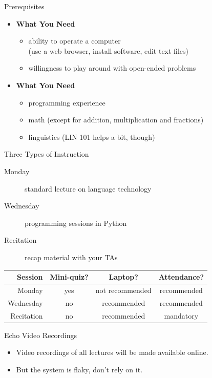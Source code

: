 \documentclass[professionalfonts, xcolor={usenames,svgnames,x11names,table}]{beamer}
\begin{document}
\begin{frame}{Prerequisites}
    \begin{itemize}
        \item \textbf{What You Need}
            \begin{itemize}
                \item ability to operate a computer\\
                    (use a web browser, install software, edit text files)
                \item willingness to play around with open-ended problems
            \end{itemize}
        \item \textbf{What You  Need}
            \begin{itemize}
                \item programming experience
                \item math (except for addition, multiplication and fractions)
                \item linguistics (LIN 101 helps a bit, though)
            \end{itemize}
    \end{itemize}
\end{frame}

\begin{frame}{Three Types of Instruction}
    \begin{description}
        \item[Monday] standard lecture on language technology
        \item[Wednesday] programming sessions in Python
        \item[Recitation] recap material with your TAs
    \end{description}

    \begin{center}
        \begin{tabular}{rccc}
                \toprule
                \textbf{Session} & \textbf{Mini-quiz?} & \textbf{Laptop?} & \textbf{Attendance?}\\
                \midrule
                Monday & yes & not recommended & recommended\\
                Wednesday & no & recommended & recommended\\
                Recitation & no & recommended & mandatory\\
                \bottomrule
        \end{tabular}
    \end{center}

    \pause
    \begin{block}{Echo Video Recordings}
        \begin{itemize}
            \item Video recordings of all lectures will be made available online.
            \item But the system is flaky, don't rely on it.
        \end{itemize}
    \end{block}
\end{frame}
\end{document}
